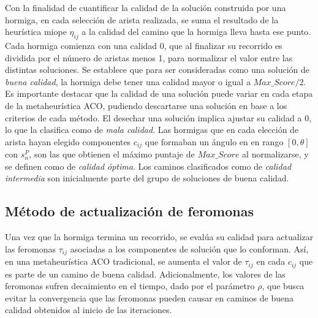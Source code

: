 Con la finalidad de cuantificar la calidad de la soluci\'on construida por una hormiga, en cada selecci\'on de arista realizada, se suma el resultado de la heur\'istica miope $\eta_{ij}$ a la calidad del camino que la hormiga lleva hasta ese punto. Cada hormiga comienza con una calidad 0, que al finalizar su recorrido es dividida por el n\'umero de aristas menos 1, para normalizar el valor entre las distintas soluciones. Se establece que para ser consideradas como una soluci\'on de {\it buena calidad}, la hormiga debe tener una calidad mayor o igual a $Max\_Score/2$. Es importante destacar que la calidad de una soluci\'on puede variar en cada etapa de la metaheur\'istica ACO, pudiendo descartarse una soluci\'on en base a los criterios de cada m\'etodo. El desechar una soluci\'on implica ajustar su calidad a 0, lo que la clasifica como de {\it mala calidad}. Las hormigas que en cada elecci\'on de arista hayan elegido componentes $c_{ij}$ que formaban un \'angulo en en rango $[0, \theta]$ con $s_{n}^{P}$, son las que obtienen el m\'aximo puntaje de $Max\_Score$ al normalizarse, y se definen como de {\it calidad \'optima}. Los caminos clasificados como de {\it calidad intermedia} son inicialmente parte del grupo de soluciones de buena calidad.






\subsection{M\'etodo de actualizaci\'on de feromonas}
\label{subsec:pheroUpdate}
Una vez que la hormiga termina un recorrido, se eval\'ua su calidad para actualizar las feromonas $\tau_{ij}$ asociadas a los componentes de soluci\'on que lo conforman. As\'i, en una metaheur\'istica ACO tradicional, se aumenta el valor de $\tau_{ij}$ en cada $c_{ij}$ que es parte de un camino de buena calidad. Adicionalmente, los valores de las feromonas sufren decaimiento en el tiempo, dado por el par\'ametro $\rho$, que busca evitar la convergencia que las feromonas pueden causar en caminos de buena calidad obtenidos al inicio de las iteraciones.


